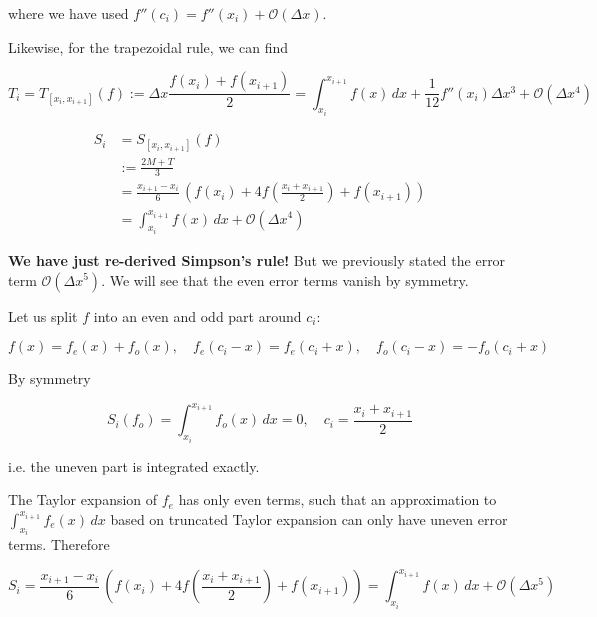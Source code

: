 where we have used $f''(c_i) = f''(x_i) + \mathcal{O}(\Delta x)$.

Likewise, for the trapezoidal rule, we can find

\begin{equation}
    T_i = T_{[x_i, x_{i+1}]}(f) := \Delta x \frac{f(x_i) + f(x_{i+1})}{2} = \int_{x_i}^{x_{i+1}} f(x) \, dx + \frac{1}{12} f''(x_i)\Delta x^3 + \mathcal{O}(\Delta x^4)
\end{equation}


\begin{equation}
    \begin{aligned}
        S_i &= S_{[x_i, x_{i+1}]}(f) \\
            &:= \frac{2M+T}{3} \\
            & = \frac{x_{i+1} - x_i}{6} \, \left(f(x_i) + 4 f\left(\frac{x_i + x_{i+1}}{2}\right) + f(x_{i+1})\right) \\
            &= \int_{x_i}^{x_{i+1}} f(x) \, dx + \mathcal{O}(\Delta x^4)
    \end{aligned}
\end{equation}

\textbf{We have just re-derived Simpson's rule!} But we previously stated the error term $\mathcal{O}(\Delta x^5)$.
We will see that the even error terms vanish by symmetry.

Let us split $f$ into an even and odd part around $c_i$:

\begin{equation}
    f(x) = f_e(x) + f_o(x), \quad f_e(c_i - x) = f_e(c_i + x), \quad  f_o(c_i - x) = -f_o(c_i + x)
\end{equation}

By symmetry

\begin{equation}
    S_i(f_o) = \int_{x_i}^{x_{i+1}} f_o(x) \, dx = 0, \quad c_i = \frac{x_i + x_{i+1}}{2}
\end{equation}

i.e. the uneven part is integrated exactly.

The Taylor expansion of $f_e$ has only even terms, such that
an approximation to $\int_{x_i}^{x_{i+1}} f_e(x) \, dx$ based on truncated
Taylor expansion can only have uneven error terms. Therefore

\begin{equation}
    S_i =\frac{x_{i+1} - x_i}{6} \, \left(f(x_i) + 4 f\left(\frac{x_i + x_{i+1}}{2}\right) + f(x_{i+1})\right) = \int_{x_i}^{x_{i+1}} f(x) \, dx + \mathcal{O}(\Delta x^5)
\end{equation}


